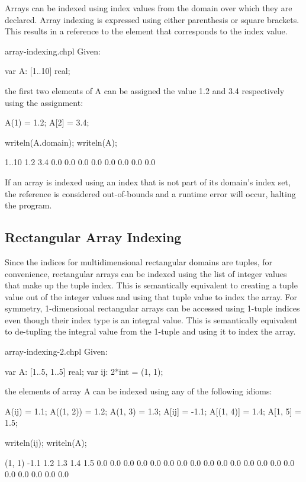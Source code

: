 Arrays can be indexed using index values from the domain over which
they are declared.  Array indexing is expressed using either
parenthesis or square brackets.  This results in a reference to the
element that corresponds to the index value.


\begin{chapelexample}{array-indexing.chpl}
Given:
\begin{chapel}
var A: [1..10] real;
\end{chapel}
the first two elements of A can be assigned the value 1.2 and 3.4
respectively using the assignment:
\begin{chapel}
A(1) = 1.2;
A[2] = 3.4;
\end{chapel}
\begin{chapelpost}
writeln(A.domain);
writeln(A);
\end{chapelpost}
\begin{chapeloutput}
{1..10}
1.2 3.4 0.0 0.0 0.0 0.0 0.0 0.0 0.0 0.0
\end{chapeloutput}
\end{chapelexample}

If an array is indexed using an index that is not part of its domain's
index set, the reference is considered out-of-bounds and a runtime
error will occur, halting the program.


\subsection{Rectangular Array Indexing}
\label{Rectangular_Array_Indexing}

Since the indices for multidimensional rectangular domains are tuples,
for convenience, rectangular arrays can be indexed using the list of
integer values that make up the tuple index.  This is semantically
equivalent to creating a tuple value out of the integer values and
using that tuple value to index the array.  For symmetry,
1-dimensional rectangular arrays can be accessed using 1-tuple indices
even though their index type is an integral value.  This is
semantically equivalent to de-tupling the integral value from the
1-tuple and using it to index the array.

\begin{chapelexample}{array-indexing-2.chpl}
Given:
\begin{chapel}
var A: [1..5, 1..5] real;
var ij: 2*int = (1, 1);
\end{chapel}
the elements of array A can be indexed using any of the following
idioms:
\begin{chapel}
A(ij) = 1.1;
A((1, 2)) = 1.2;
A(1, 3) = 1.3;
A[ij] = -1.1;
A[(1, 4)] = 1.4;
A[1, 5] = 1.5;
\end{chapel}
\begin{chapelpost}
writeln(ij);
writeln(A);
\end{chapelpost}
\begin{chapeloutput}
(1, 1)
-1.1 1.2 1.3 1.4 1.5
0.0 0.0 0.0 0.0 0.0
0.0 0.0 0.0 0.0 0.0
0.0 0.0 0.0 0.0 0.0
0.0 0.0 0.0 0.0 0.0
\end{chapeloutput}
\end{chapelexample}

